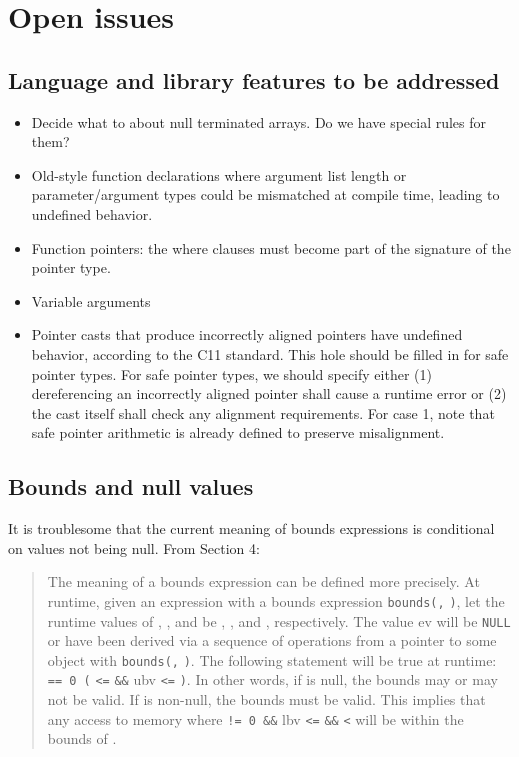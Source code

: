 \chapter{Open issues}
\label{chapter:open-issues}

\section{Language and library features to be addressed}\label{language-and-library-features-to-be-addressed}

\begin{itemize}
\item
  Decide what to about null terminated arrays. Do we have special rules
  for them?
\item
  Old-style function declarations where argument list length or
  parameter/argument types could be mismatched at compile time, leading
  to undefined behavior.
\item
  Function pointers: the where clauses must become part of the signature
  of the pointer type.
\item
  Variable arguments
\item
  Pointer casts that produce incorrectly aligned pointers have undefined
  behavior, according to the C11 standard. This hole should be filled in
  for safe pointer types. For safe pointer types, we should specify
  either (1) dereferencing an incorrectly aligned pointer shall cause a
  runtime error or (2) the cast itself shall check any alignment
  requirements. For case 1, note that safe pointer arithmetic is already
  defined to preserve misalignment.
\end{itemize}

\section{Bounds and null values}\label{bounds-and-null-values}

It is troublesome that the current meaning of bounds expressions is
conditional on values not being null. From Section 4:

\begin{quote}
The meaning of a bounds expression can be defined more precisely. At
runtime, given an expression  with a bounds expression
\texttt{bounds(}\texttt{,} \texttt{)}, let the runtime
values of , , and  be , ,
and , respectively. The value ev will be \texttt{NULL} or have
been derived via a sequence of operations from a pointer to some object
 with \texttt{bounds(}\texttt{,}
\texttt{)}. The following statement will be true at runtime:
 \texttt{== 0 \textbar{}\textbar{} (}
\texttt{\textless{}=}  \texttt{\&\&} ubv \texttt{\textless{}=}
\texttt{)}. In other words, if  is null, the bounds
may or may not be valid. If  is non-null, the bounds must be
valid. This implies that any access to memory where  \texttt{!=
0 \&\&} lbv \texttt{\textless{}=}  \texttt{\&\&} 
\texttt{\textless{}}  will be within the bounds of .
\end{quote}

